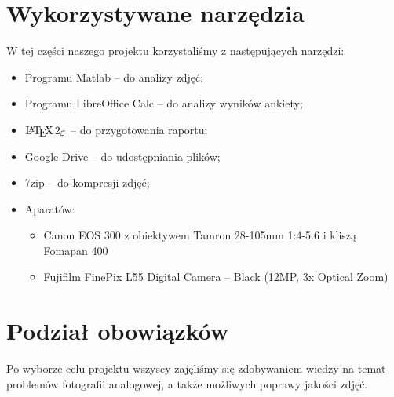 \documentclass[]{mwart}
\begin{document}
\section{Wykorzystywane narzędzia}
W tej części naszego projektu korzystaliśmy z następujących narzędzi:
\begin{itemize}
    \item Programu Matlab -- do analizy zdjęć;
    \item Programu LibreOffice Calc -- do analizy wyników ankiety;
    \item $\LaTeXe{}$ -- do przygotowania raportu;
    \item Google Drive -- do udostępniania plików;
    \item 7zip -- do kompresji zdjęć;
    \item Aparatów:
          \begin{itemize}
              \item Canon EOS 300 z obiektywem Tamron 28-105mm 1:4-5.6 i kliszą Fomapan 400
              \item Fujifilm FinePix L55 Digital Camera -- Black (12MP, 3x Optical Zoom)
          \end{itemize}
\end{itemize}


\section{Podział obowiązków}
Po wyborze celu projektu wszyscy zajęliśmy się zdobywaniem wiedzy na
temat problemów fotografii analogowej, a także możliwych poprawy jakości zdjęć.\newline
\end{document}
